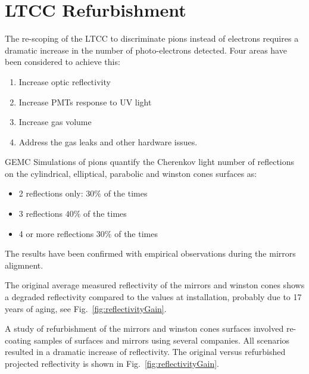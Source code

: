 \section{LTCC Refurbishment}


The re-scoping of the LTCC to discriminate pions instead of electrons requires a dramatic increase in the
number of photo-electrons detected. Four areas have been considered to achieve this:

\begin{enumerate}
	\item Increase optic reflectivity
	\item Increase PMTs response to UV light
	\item Increase gas volume
	\item Address the gas leaks and other hardware issues.
\end{enumerate}


GEMC Simulations of pions quantify the Cherenkov light number of reflections on the cylindrical, elliptical,
parabolic and winston cones surfaces as:

\begin{itemize}
	\item 2 reflections only: $30\%$ of the times
	\item 3 reflections $40\%$ of the times
	\item 4 or more reflections $30\%$ of the times
\end{itemize}

The results have been confirmed with empirical observations during the mirrors aligmnent.

The original average measured reflectivity of the mirrors and winston cones
shows a degraded reflectivity compared to the values at installation, probably due to  17 years of aging, see Fig.~\ref{fig:reflectivityGain}.

A study of refurbishment of the mirrors and winston cones surfaces
involved re-coating samples of surfaces and mirrors using several companies.
All scenarios resulted in a dramatic increase of reflectivity. The original versus refurbished projected
reflectivity is shown in Fig.~\ref{fig:reflectivityGain}.

